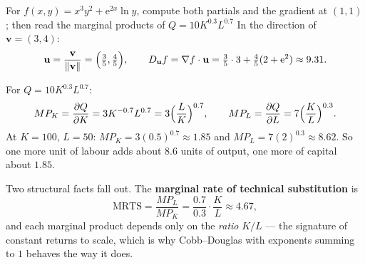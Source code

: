 \begin{worked}{For $f(x,y)=x^{3}y^{2}+\mathrm{e}^{2x}\ln y$, compute both partials and the gradient at $(1,1)$; then read the marginal products of $Q=10K^{0.3}L^{0.7}$}
In the direction of $\mathbf v=(3,4)$:
\[
  \mathbf u=\frac{\mathbf v}{\|\mathbf v\|}=\Bigl(\tfrac35,\tfrac45\Bigr),
  \qquad
  D_{\mathbf u}f=\nabla f\cdot\mathbf u
  =\tfrac35\cdot3+\tfrac45(2+\mathrm{e}^{2})\approx9.31 .
\]

For $Q=10K^{0.3}L^{0.7}$:
\[
  MP_{K}=\frac{\partial Q}{\partial K}=3K^{-0.7}L^{0.7}=3\Bigl(\frac{L}{K}\Bigr)^{0.7},
  \qquad
  MP_{L}=\frac{\partial Q}{\partial L}=7\Bigl(\frac{K}{L}\Bigr)^{0.3} .
\]
At $K=100$, $L=50$: $MP_{K}=3(0.5)^{0.7}\approx1.85$ and
$MP_{L}=7(2)^{0.3}\approx8.62$. So one more unit of labour adds about $8.6$
units of output, one more of capital about $1.85$.

Two structural facts fall out. The \textbf{marginal rate of technical
substitution} is
\[
  \mathrm{MRTS}=\frac{MP_{L}}{MP_{K}}=\frac{0.7}{0.3}\cdot\frac{K}{L}\approx4.67 ,
\]
and each marginal product depends only on the \emph{ratio} $K/L$ --- the
signature of constant returns to scale, which is why Cobb--Douglas with
exponents summing to $1$ behaves the way it does.
\end{worked}

